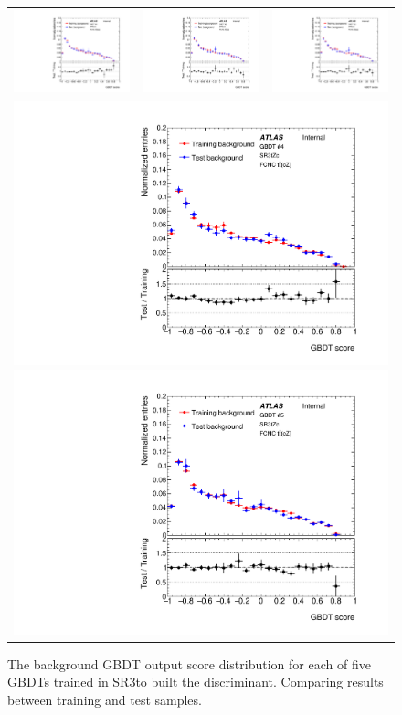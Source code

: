 \begin{figure}[htbp]
	\centering
	\begin{tabular}{ccc}
		\includegraphics[width=.3\textwidth]{Chapters/CH6/figures/SR3_UsingSMT/BDT/GBDT_background_Fold1} &
		\includegraphics[width=.3\textwidth]{Chapters/CH6/figures/SR3_UsingSMT/BDT/GBDT_background_Fold2} &
		\includegraphics[width=.3\textwidth]{Chapters/CH6/figures/SR3_UsingSMT/BDT/GBDT_background_Fold3} \\ 
		\multicolumn{3}{c}{
		\includegraphics[width=.3\textwidth]{Chapters/CH6/figures/SR3_UsingSMT/BDT/GBDT_background_Fold4}
		\includegraphics[width=.3\textwidth]{Chapters/CH6/figures/SR3_UsingSMT/BDT/GBDT_background_Fold5}} \\
	\end{tabular}
	\caption{ The background GBDT output score distribution for each of five GBDTs trained in SR3\tZc to built the \Dthree discriminant. 
		Comparing results between training and test samples.
	}%
	\label{fig:separation:SR3:GBDTbkg}
\end{figure}

